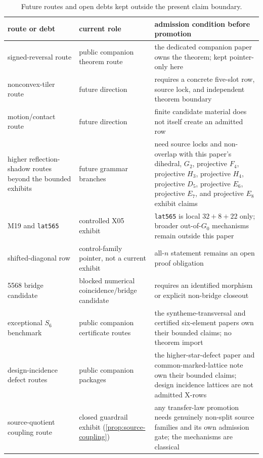 \begin{table}[!htbp]
\centering\caption{Future routes and open debts kept outside the present claim boundary.}
\label{tab:future-routes}
\begin{tabular}{@{}L{0.20\textwidth}L{0.31\textwidth}L{0.39\textwidth}@{}}
\toprule
route or debt & current role & admission condition before promotion \\
\midrule
signed-reversal route & public companion theorem route & the dedicated companion paper owns the theorem; kept pointer-only here \\
nonconvex-tiler route & future direction & requires a concrete five-slot row, source lock, and independent theorem boundary \\
motion/contact route & future direction & finite candidate material does not itself create an admitted row \\
higher reflection-shadow routes beyond the bounded exhibits & future grammar branches & need source locks and non-overlap with this paper's dihedral, \(G_2\), projective \(F_4\), projective \(H_3\), projective \(H_4\), projective \(D_5\), projective \(E_6\), projective \(E_7\), and projective \(E_8\) exhibit claims \\
M19 and \texttt{lat565} & controlled X05 exhibit & \texttt{lat565} is local \(32+8+22\) only; broader out-of-\(G_0\) mechanisms remain outside this paper \\
shifted-diagonal row & control-family pointer, not a current exhibit & all-\(n\) statement remains an open proof obligation \\
5568 bridge candidate & blocked numerical coincidence/bridge candidate & requires an identified morphism or explicit non-bridge closeout \\
exceptional \(S_6\) benchmark & public companion certificate routes & the syntheme-transversal and certified six-element papers own their bounded claims; no theorem import \\
design-incidence defect routes & public companion packages & the higher-star-defect paper and common-marked-lattice note own their bounded claims; design incidence lattices are not admitted X-rows \\
source-quotient coupling route & closed guardrail exhibit (\cref{prop:source-coupling}) & any transfer-law promotion needs genuinely non-split source families and its own admission gate; the mechanisms are classical \\
\bottomrule
\end{tabular}\end{table}

